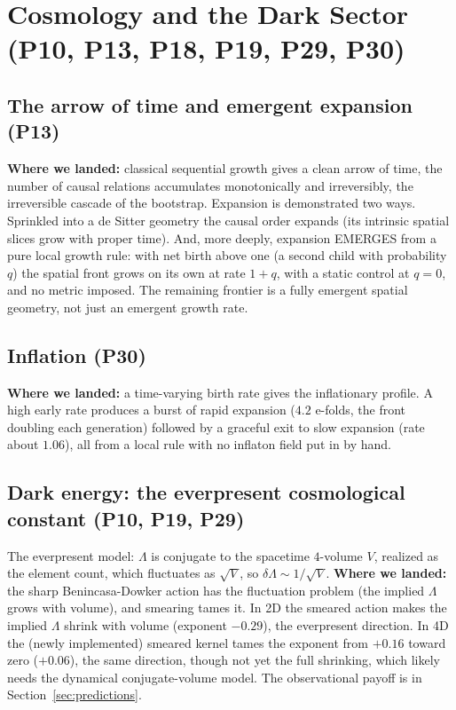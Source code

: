 \section{Cosmology and the Dark Sector (P10, P13, P18, P19, P29, P30)}
\label{sec:cosmology}

\subsection{The arrow of time and emergent expansion (P13)}

\textbf{Where we landed:} classical sequential growth gives a clean arrow of time, the
number of causal relations accumulates monotonically and irreversibly, the irreversible
cascade of the bootstrap. Expansion is demonstrated two ways. Sprinkled into a de Sitter
geometry the causal order expands (its intrinsic spatial slices grow with proper time).
And, more deeply, expansion EMERGES from a pure local growth rule: with net birth above
one (a second child with probability $q$) the spatial front grows on its own at rate
$1+q$, with a static control at $q=0$, and no metric imposed. The remaining frontier is
a fully emergent spatial geometry, not just an emergent growth rate.

\subsection{Inflation (P30)}

\textbf{Where we landed:} a time-varying birth rate gives the inflationary profile. A
high early rate produces a burst of rapid expansion ($4.2$ e-folds, the front doubling
each generation) followed by a graceful exit to slow expansion (rate about $1.06$), all
from a local rule with no inflaton field put in by hand.

\subsection{Dark energy: the everpresent cosmological constant (P10, P19, P29)}

The everpresent model: $\Lambda$ is conjugate to the spacetime $4$-volume $V$, realized
as the element count, which fluctuates as $\sqrt{V}$, so $\delta\Lambda \sim 1/\sqrt{V}$.
\textbf{Where we landed:} the sharp Benincasa-Dowker action has the fluctuation problem
(the implied $\Lambda$ grows with volume), and smearing tames it. In 2D the smeared
action makes the implied $\Lambda$ shrink with volume (exponent $-0.29$), the everpresent
direction. In 4D the (newly implemented) smeared kernel tames the exponent from $+0.16$
toward zero ($+0.06$), the same direction, though not yet the full shrinking, which
likely needs the dynamical conjugate-volume model. The observational payoff is in
Section~\ref{sec:predictions}.

